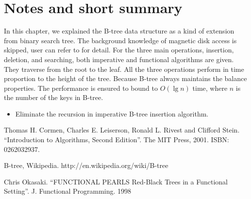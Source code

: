 \documentclass[UTF8]{article}
\begin{document}
\section{Notes and short summary}
In this chapter, we explained the B-tree data structure as a kind of
extension from binary search tree. The background knowledge of
magnetic disk access is skipped, user can refer to \cite{CLRS}
for detail. For the three main operations, insertion, deletion,
and searching, both imperative and functional algorithms are
given. They traverse from the root to the leaf. All the three
operations perform in time proportion to the height of the tree.
Because B-tree always maintains the balance properties. The
performance is ensured to bound to $O(\lg n)$ time,
where $n$ is the number of the keys in B-tree.

\begin{Exercise}
\begin{itemize}
\item Eliminate the recursion in imperative B-tree insertion algorithm.
\end{itemize}
\end{Exercise}

\begin{thebibliography}{99}

Thomas H. Cormen, Charles E. Leiserson, Ronald L. Rivest and Clifford Stein. ``Introduction to Algorithms, Second Edition''. The MIT Press, 2001. ISBN: 0262032937.

B-tree, Wikipedia. http://en.wikipedia.org/wiki/B-tree

Chris Okasaki. ``FUNCTIONAL PEARLS Red-Black Trees in a Functional Setting''. J. Functional Programming. 1998

\end{thebibliography}

\ifx\wholebook\relax \else
\end{document}
